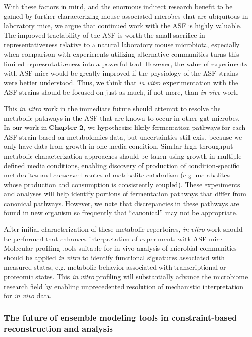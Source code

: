 \documentclass[11pt,onecolumn,notitlepage,openany,twoside]{book}
\begin{document}
\begin{refsection}
With these factors in mind, and the enormous indirect research benefit to be gained by further characterizing mouse-associated microbes that are ubiquitous in laboratory mice, we argue that continued work with the ASF is highly valuable. The improved tractability of the ASF is worth the small sacrifice in representativeness relative to a natural laboratory mouse microbiota, especially when comparison with experiments utilizing alternative communities turns this limited representativeness into a powerful tool. However, the value of experiments with ASF mice would be greatly improved if the physiology of the ASF strains were better understood. Thus, we think that \textit{in vitro} experimentation with the ASF strains should be focused on just as much, if not more, than \textit{in vivo} work.

This \textit{in vitro} work in the immediate future should attempt to resolve the metabolic pathways in the ASF that are known to occur in other gut microbes. In our work in \textbf{Chapter 2}, we hypothesize likely fermentation pathways for each ASF strain based on metabolomics data, but uncertainties still exist because we only have data from growth in one media condition. Similar high-throughput metabolic characterization approaches should be taken using growth in multiple defined media conditions, enabling discovery of production of condition-specific metabolites and conserved routes of metabolite catabolism (e.g. metabolites whose production and consumption is consistently coupled). These experiments and analyses will help identify portions of fermentation pathways that differ from canonical pathways. However, we note that discrepancies in these pathways are found in new organism so frequently that “canonical” may not be appropriate.

After initial characterization of these metabolic repertoires, \textit{in vitro} work should be performed that enhances interpretation of experiments with ASF mice. Molecular profiling tools suitable for in vivo analysis of microbial communities should be applied \textit{in vitro} to identify functional signatures associated with measured states, e.g. metabolic behavior associated with transcriptional or proteomic states. This \textit{in vitro} profiling will substantially advance the microbiome research field by enabling unprecedented resolution of mechanistic interpretation for \textit{in vivo} data.

\subsubsection{The future of ensemble modeling tools in constraint-based reconstruction and analysis}


\end{refsection}
\end{document}
